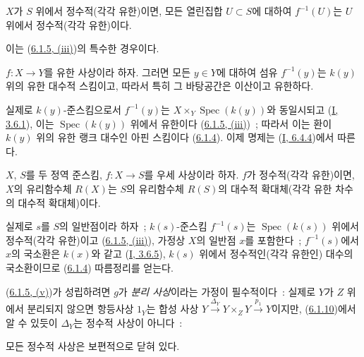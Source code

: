 \begin{corollary}[6.1.6]
\label{II.6.1.6-ko}
$X$가 $S$ 위에서 정수적(각각 유한)이면, 모든 열린집합 $U\subset S$에
대하여 $f^{-1}(U)$는 $U$ 위에서 정수적(각각 유한)이다.
\end{corollary}

이는 (\hyperref[II.6.1.5-ko]{6.1.5, (iii)})의 특수한 경우이다.

\begin{corollary}[6.1.7]
\label{II.6.1.7-ko}
$f:X\to Y$를 유한 사상이라 하자. 그러면 모든 $y\in Y$에 대하여 섬유
$f^{-1}(y)$는 $k(y)$ 위의 유한 대수적 스킴이고, 따라서 특히 그
바탕공간은 이산이고 유한하다.
\end{corollary}

실제로 $k(y)$-준스킴으로서 $f^{-1}(y)$는
$X\times_Y\operatorname{Spec}(k(y))$와 동일시되고
(\hyperref[I.3.6.1-ko]{I, 3.6.1}), 이는
$\operatorname{Spec}(k(y))$ 위에서 유한이다
(\hyperref[II.6.1.5-ko]{6.1.5, (iii)})~; 따라서 이는 환이 $k(y)$ 위의
유한 랭크 대수인 아핀 스킴이다
(\hyperref[II.6.1.4-ko]{6.1.4}). 이제 명제는
(\hyperref[I.6.4.4-ko]{I, 6.4.4})에서 따른다.

\begin{corollary}[6.1.8]
\label{II.6.1.8-ko}
$X$, $S$를 두 정역 준스킴, $f:X\to S$를 우세 사상이라 하자. $f$가
정수적(각각 유한)이면, $X$의 유리함수체 $R(X)$는 $S$의 유리함수체
$R(S)$의 대수적 확대체(각각 유한 차수의 대수적 확대체)이다.
\end{corollary}

실제로 $s$를 $S$의 일반점이라 하자~; $k(s)$-준스킴 $f^{-1}(s)$는
$\operatorname{Spec}(k(s))$ 위에서 정수적(각각 유한)이고
(\hyperref[II.6.1.5-ko]{6.1.5, (iii)}), 가정상 $X$의 일반점 $x$를
포함한다~; $f^{-1}(s)$에서 $x$의 국소환은 $k(x)$와 같고
(\hyperref[I.3.6.5-ko]{I, 3.6.5}), $k(s)$ 위에서 정수적인(각각 유한인)
대수의 국소환이므로 (\hyperref[II.6.1.4-ko]{6.1.4}) 따름정리를 얻는다.

\begin{remark}[6.1.9]
\label{II.6.1.9-ko}
(\hyperref[II.6.1.5-ko]{6.1.5, (v)})가 성립하려면 $g$가 \emph{분리
사상}이라는 가정이 필수적이다~: 실제로 $Y$가 $Z$ 위에서 분리되지
않으면 항등사상 $1_Y$는 합성 사상
$Y\xrightarrow{\Delta_Y}Y\times_ZY\xrightarrow{p_1}Y$이지만,
(\hyperref[II.6.1.10-ko]{6.1.10})에서 알 수 있듯이 $\Delta_Y$는 정수적
사상이 아니다~:
\end{remark}

\begin{proposition}[6.1.10]
\label{II.6.1.10-ko}
모든 정수적 사상은 보편적으로 닫혀 있다.
\end{proposition}

